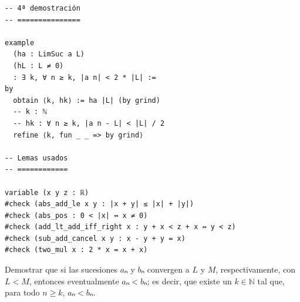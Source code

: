\begin{verbatim}
-- 4ª demostración
-- ===============

example
  (ha : LimSuc a L)
  (hL : L ≠ 0)
  : ∃ k, ∀ n ≥ k, |a n| < 2 * |L| :=
by
  obtain ⟨k, hk⟩ := ha |L| (by grind)
  -- k : ℕ
  -- hk : ∀ n ≥ k, |a n - L| < |L| / 2
  refine ⟨k, fun _ _ => by grind⟩

-- Lemas usados
-- ============

variable (x y z : ℝ)
#check (abs_add_le x y : |x + y| ≤ |x| + |y|)
#check (abs_pos : 0 < |x| ↔ x ≠ 0)
#check (add_lt_add_iff_right x : y + x < z + x ↔ y < z)
#check (sub_add_cancel x y : x - y + y = x)
#check (two_mul x : 2 * x = x + x)
\end{verbatim}

\begin{ejercicio}
  Demostrar que si las sucesiones $aₙ$ y $bₙ$ convergen a $L$ y $M$,
  respectivamente, con $L < M$, entonces eventualmente $aₙ < bₙ$; es decir,
  que existe un $k ∈ ℕ$ tal que, para todo $n ≥ k$, $aₙ < bₙ$.
\end{ejercicio}

